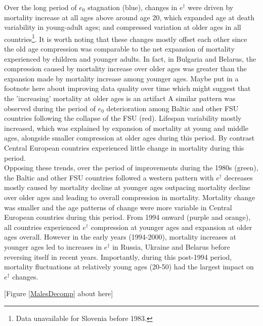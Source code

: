 \documentclass{article}
\begin{document}
\begin{spacing}{1.5}
Over the long period of $e_0$ stagnation (blue), changes in $e^\dagger$ were driven by \textcolor[rgb]{1,0,0}{mortality increase at all ages above around age 20}, which expanded age at death variability in young-adult ages; and compressed variation at older ages in all countries\footnote{Data unavailable for Slovenia before 1983.}. It is worth noting that these changes \textcolor[rgb]{1,0,0}{mostly} offset each other since the old age compression was comparable to the net expansion of mortality experienced by children and younger adults. In fact, in Bulgaria and Belarus, the compression caused by mortality increase over older ages was greater than the expansion made by mortality increase among younger ages. \textcolor[rgb]{1,0,0}{Maybe put in a footnote here about improving data quality over time which might suggest that the 'increasing' mortality at older ages is an artifact} A similar pattern was observed during the period of $e_0$ deterioration \textcolor[rgb]{1,0,0}{among Baltic and other FSU countries following the collapse of the FSU} (red). Lifespan variability mostly increased, which was explained by expansion of mortality at young and middle ages, alongside smaller compression at older ages during this period. \textcolor[rgb]{1,0,0}{By contrast Central European countries experienced little change in mortality during this period.}\\

Opposing these trends, over the period of improvements \textcolor[rgb]{1,0,0}{during the 1980s} (green), \textcolor[rgb]{1,0,0}{the Baltic and other FSU countries} followed a western pattern with $e^\dagger$ decreases mostly caused by mortality decline at younger ages outpacing mortality decline over older ages and leading to overall compression in mortality. Mortality change was smaller and the age patterns of change were more variable in Central European countries during this period. From 1994 onward (purple and orange), all countries experienced $e^\dagger$ compression at younger ages and expansion at older ages overall. However in the early years (1994-2000), mortality increases at younger ages led to increases in $e^\dagger$ in Russia, Ukraine and Belarus before reversing itself in recent years. Importantly, during this post-1994 period, mortality fluctuations at relatively young ages (20-50) had the largest impact on $e^\dagger$ changes.\\



\begin{center}
[Figure \ref{MalesDecomp} about here]\\
\end{center}


\end{spacing}
\end{document}
